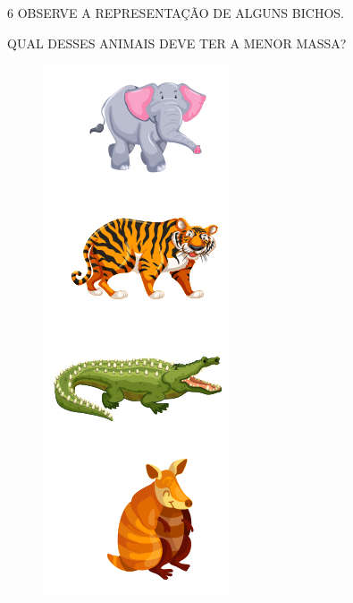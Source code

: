 \pagebreak
\num{6} OBSERVE A REPRESENTAÇÃO DE ALGUNS BICHOS.


QUAL DESSES ANIMAIS DEVE TER A MENOR MASSA?

\begin{figure}[htpb!]
\includegraphics[width=.45\textwidth]{./media/SAEB_1ANO_MAT_FIGURA131.png}
\end{figure}


